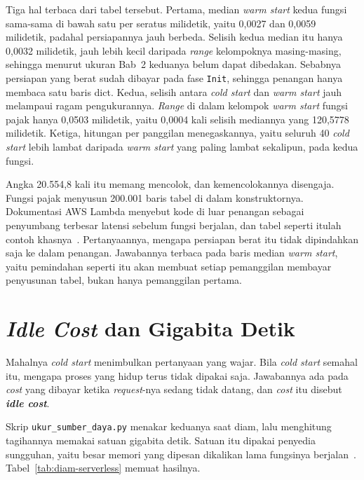 Tiga hal terbaca dari tabel tersebut. Pertama, median \textit{warm start}
kedua fungsi sama-sama di bawah satu per seratus milidetik, yaitu 0,0027 dan
0,0059 milidetik, padahal persiapannya jauh berbeda. Selisih kedua median itu
hanya 0,0032 milidetik, jauh lebih kecil daripada
\textit{range} kelompoknya
masing-masing, sehingga menurut ukuran Bab~2 keduanya belum dapat dibedakan.
Sebabnya persiapan yang berat sudah dibayar pada fase \texttt{Init}, sehingga
penangan hanya membaca satu baris dict. Kedua, selisih antara \textit{cold
start} dan \textit{warm start} jauh melampaui ragam pengukurannya.
\textit{Range} di dalam kelompok \textit{warm start} fungsi pajak hanya 0,0503
milidetik, yaitu 0,0004 kali selisih mediannya yang 120,5778 milidetik.
Ketiga, hitungan per panggilan menegaskannya, yaitu seluruh 40 \textit{cold
start} lebih lambat daripada \textit{warm start} yang paling lambat sekalipun,
pada kedua fungsi.

Angka 20.554,8 kali itu memang mencolok, dan kemencolokannya disengaja. Fungsi
pajak menyusun 200.001 baris tabel di dalam konstruktornya. Dokumentasi AWS
Lambda menyebut kode di luar penangan sebagai penyumbang terbesar latensi
sebelum fungsi berjalan, dan tabel seperti itulah contoh
khasnya~\cite{aws2026lambda}. Pertanyaannya, mengapa persiapan berat itu tidak
dipindahkan saja ke dalam penangan. Jawabannya terbaca pada baris median
\textit{warm start}, yaitu pemindahan seperti itu akan membuat setiap
pemanggilan membayar penyusunan tabel, bukan hanya pemanggilan pertama.

\section{\textit{Idle Cost} dan Gigabita Detik}

Mahalnya \textit{cold start} menimbulkan pertanyaan yang wajar. Bila
\textit{cold start} semahal itu, mengapa proses yang hidup terus tidak dipakai saja.
Jawabannya ada pada \textit{cost} yang dibayar ketika \textit{request}-nya sedang tidak
datang, dan \textit{cost} itu disebut \textbf{\textit{idle
cost}}.

Skrip \texttt{ukur\_sumber\_daya.py} menakar keduanya saat diam, lalu
menghitung tagihannya memakai satuan gigabita detik. Satuan itu dipakai
penyedia sungguhan, yaitu besar memori yang dipesan dikalikan lama fungsinya
berjalan~\cite{aws2026lambda}. Tabel~\ref{tab:diam-serverless} memuat hasilnya.

